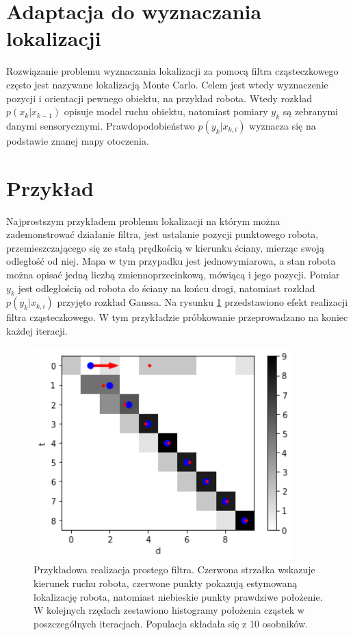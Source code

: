 \section{Adaptacja do wyznaczania lokalizacji}
Rozwiązanie problemu wyznaczania lokalizacji za pomocą filtra cząsteczkowego często jest nazywane lokalizacją Monte Carlo. Celem jest wtedy wyznaczenie pozycji i orientacji pewnego obiektu, na przykład robota. Wtedy rozkład $p(x_k|x_{k-1})$ opisuje model ruchu obiektu, natomiast pomiary $y_k$ są zebranymi danymi sensorycznymi. Prawdopodobieństwo $p(y_k|x_{k,i})$ wyznacza się na podstawie znanej mapy otoczenia.

\section{Przykład}\label{simple_example_chap}
Najprostszym przykładem problemu lokalizacji na którym można zademonstrować działanie filtra, jest ustalanie pozycji punktowego robota, przemieszczającego się ze stałą prędkością w kierunku ściany, mierząc swoją odległość od niej. Mapa w tym przypadku jest jednowymiarowa, a stan robota można opisać jedną liczbą zmiennoprzecinkową, mówiącą i jego pozycji. Pomiar $y_k$ jest odległością od robota do ściany na końcu drogi, natomiast rozkład $p(y_k|x_{k,i})$ przyjęto rozkład Gaussa. Na rysunku \ref{simple_example} przedstawiono efekt realizacji filtra cząsteczkowego. W tym przykładzie próbkowanie przeprowadzano na koniec każdej iteracji.

\begin{figure}
	\begin{center}
		\includegraphics[width=10cm]{./simple_example.png}
		\caption{Przykładowa realizacja prostego filtra. Czerwona strzałka wskazuje kierunek ruchu robota, czerwone punkty pokazują estymowaną lokalizację robota, natomiast niebieskie punkty prawdziwe położenie. W kolejnych rzędach zestawiono histogramy położenia cząstek w poszczególnych iteracjach. Populacja składała się z 10 osobników.}\label{simple_example}
	\end{center}
\end{figure}

